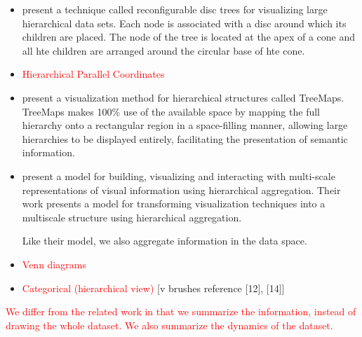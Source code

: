 \begin{itemize}
	\item \cite{729555} present a technique called
	reconfigurable disc trees for visualizing large hierarchical data sets. Each node is associated with a disc around which 
	its children are placed. The node of the tree is located at the apex of a cone and all hte children are arranged around
	the circular base of hte cone.
	
	\item \textcolor{red}{Hierarchical Parallel Coordinates}
	
	\item \cite{Johnson:1991:TSA:949607.949654} present a visualization method for hierarchical structures called TreeMaps.
	TreeMaps makes 100\% use of the available space by mapping the full hierarchy onto a rectangular region in a space-filling
	manner, allowing large hierarchies to be displayed entirely, facilitating the presentation of semantic information.

	\item \cite{Elmqvist:2010:HAI:1749404.1749525}
	present a model for building, visualizing and interacting with multi-scale representations of visual information
	using hierarchical aggregation. Their work presents a model for transforming visualization techniques into a multiscale
	structure using hierarchical aggregation.
	
	Like their model, we also aggregate information in the data space.
	
	\item \textcolor{red}{Venn diagrams}
	
	\item \textcolor{red}{Categorical (hierarchical view)} [v brushes reference [12], [14]]
\end{itemize}

\textcolor{red}{We differ from the related work in that we summarize the information, instead of drawing the whole
dataset. We also summarize the dynamics of the dataset.}